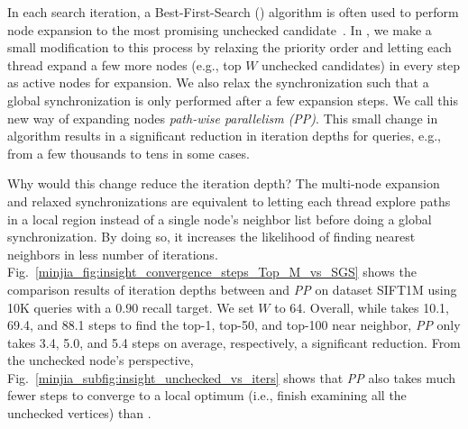 In each search iteration, a Best-First-Search (\SeqShortName) algorithm is often used to perform node expansion to the most promising unchecked candidate~\cite{hnsw,nsg}. In \Hammer, we make a small modification to this process by relaxing the priority order and letting each thread expand a few more nodes (e.g., top $W$ unchecked candidates) in every step as active nodes for expansion. We also relax the synchronization such that a global synchronization is only performed after a few expansion steps. We call this new way of expanding nodes \emph{path-wise parallelism (PP)}. This small change in algorithm results in a significant reduction in iteration depths for queries, e.g., from a few {thousands} to {tens} in some cases.

Why would this change reduce the iteration depth? The multi-node expansion and relaxed synchronizations are equivalent to letting each thread explore paths in a local region instead of a single node's neighbor list before doing a global synchronization. By doing so, it increases the likelihood of finding nearest neighbors in less number of iterations. 
Fig.~\ref{minjia_fig:insight_convergence_steps_Top_M_vs_SGS} shows the comparison results of iteration depths between \SeqShortName and \emph{PP} on dataset SIFT1M using 10K queries with a $0.90$ recall target. We set $W$ to 64. Overall, while \SeqShortName takes 10.1, 69.4, and 88.1 steps to find the top-1, top-50, and top-100 near neighbor, \emph{PP} only takes 3.4, 5.0, and 5.4 steps on average, respectively, a significant reduction. From the unchecked node's perspective, Fig.~\ref{minjia_subfig:insight_unchecked_vs_iters} shows that \emph{PP} also takes much fewer steps to converge to a local optimum (i.e., finish examining all the unchecked vertices) than \SeqShortName. 

